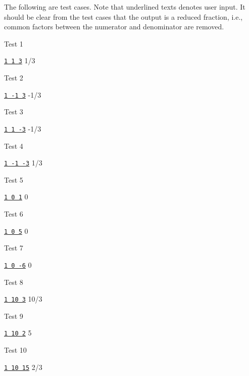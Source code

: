 The following are test cases. Note that underlined texts denotes
user input.
It should be clear from the test cases that the output
is a reduced fraction, i.e., common factors between the numerator
and denominator are removed.

Test 1
\begin{console}[commandchars=\\\{\}]
\underline{\texttt{1 1 3}}
1/3
\end{console}

Test 2
\begin{console}[commandchars=\\\{\}]
\underline{\texttt{1 -1 3}}
-1/3
\end{console}

Test 3
\begin{console}[commandchars=\\\{\}]
\underline{\texttt{1 1 -3}}
-1/3
\end{console}

Test 4
\begin{console}[commandchars=\\\{\}]
\underline{\texttt{1 -1 -3}}
1/3
\end{console}

Test 5
\begin{console}[commandchars=\\\{\}]
\underline{\texttt{1 0 1}}
0
\end{console}

Test 6
\begin{console}[commandchars=\\\{\}]
\underline{\texttt{1 0 5}}
0
\end{console}

Test 7
\begin{console}[commandchars=\\\{\}]
\underline{\texttt{1 0 -6}}
0
\end{console}

Test 8
\begin{console}[commandchars=\\\{\}]
\underline{\texttt{1 10 3}}
10/3
\end{console}

Test 9
\begin{console}[commandchars=\\\{\}]
\underline{\texttt{1 10 2}}
5
\end{console}

Test 10
\begin{console}[commandchars=\\\{\}]
\underline{\texttt{1 10 15}}
2/3
\end{console}

